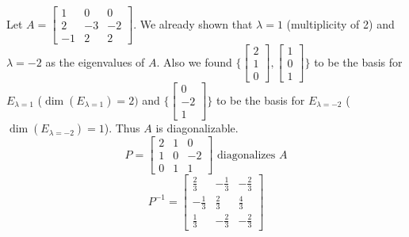 \documentclass[12pt]{article}
\begin{document}
\begin{example} Let $A = \begin{bmatrix} 1 & 0 & 0 \\ 2 & -3 & -2 \\ -1 & 2 & 2 \end{bmatrix}$. We already shown that $\lambda = 1$ (multiplicity of 2) and $\lambda = -2$ as the eigenvalues of $A$. Also we found $\{\begin{bmatrix} 2 \\ 1 \\ 0 \end{bmatrix}, \begin{bmatrix} 1 \\ 0 \\ 1 \end{bmatrix}\}$ to be the basis for $E_{\lambda = 1}$ ($\dim(E_{\lambda = 1}) = 2)$ and $\{\begin{bmatrix} 0 \\ -2 \\ 1 \end{bmatrix}\}$ to be the basis for $E_{\lambda = -2}$ ($\dim(E_{\lambda = -2}) = 1$). Thus $A$ is diagonalizable. $$P = \begin{bmatrix} 2 & 1 & 0 \\ 1 & 0 & -2 \\ 0 & 1 & 1 \end{bmatrix} \text{ diagonalizes } A $$ 
$$P^{-1} = \begin{bmatrix} \frac{2}{3} & -\frac{1}{3} & -\frac{2}{3} \\ -\frac{1}{3} & \frac{2}{3} & \frac{4}{3} \\ \frac{1}{3} & -\frac{2}{3} & -\frac{2}{3} \end{bmatrix} $$ 

\end{example}
\end{document}
